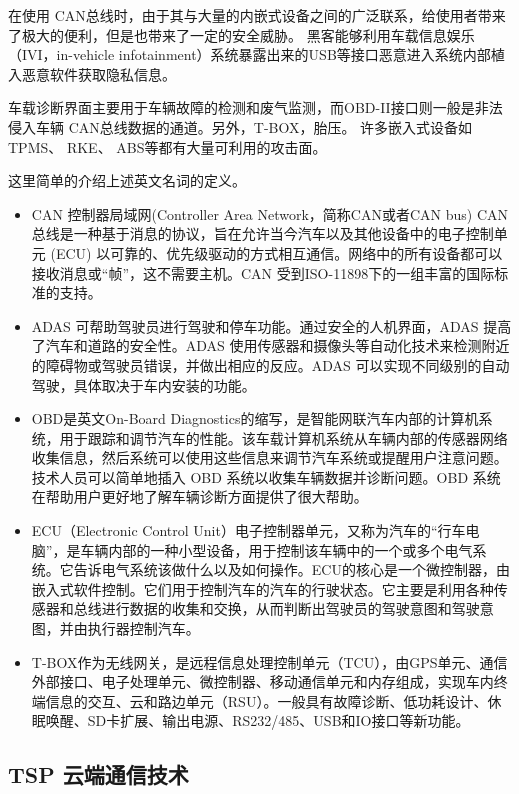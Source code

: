 在使用 CAN总线时，由于其与大量的内嵌式设备之间的广泛联系，给使用者带来了极大的便利，但是也带来了一定的安全威胁。
黑客能够利用车载信息娱乐（IVI，in-vehicle infotainment）系统暴露出来的USB等接口恶意进入系统内部植入恶意软件获取隐私信息。

车载诊断界面主要用于车辆故障的检测和废气监测，而OBD-II接口则一般是非法侵入车辆 CAN总线数据的通道。另外，T-BOX，胎压。
许多嵌入式设备如 TPMS、 RKE、 ABS等都有大量可利用的攻击面。

这里简单的介绍上述英文名词的定义。
\begin{itemize}
    \item CAN 控制器局域网(Controller Area Network，简称CAN或者CAN bus) CAN 总线是一种基于消息的协议，旨在允许当今汽车以及其他设备中的电子控制单元 (ECU) 以可靠的、优先级驱动的方式相互通信。网络中的所有设备都可以接收消息或“帧”，这不需要主机。CAN 受到ISO-11898下的一组丰富的国际标准的支持。
    \item ADAS 可帮助驾驶员进行驾驶和停车功能。通过安全的人机界面，ADAS 提高了汽车和道路的安全性。ADAS 使用传感器和摄像头等自动化技术来检测附近的障碍物或驾驶员错误，并做出相应的反应。ADAS 可以实现不同级别的自动驾驶，具体取决于车内安装的功能。
    \item OBD是英文On-Board Diagnostics的缩写，是智能网联汽车内部的计算机系统，用于跟踪和调节汽车的性能。该车载计算机系统从车辆内部的传感器网络收集信息，然后系统可以使用这些信息来调节汽车系统或提醒用户注意问题。技术人员可以简单地插入 OBD 系统以收集车辆数据并诊断问题。OBD 系统在帮助用户更好地了解车辆诊断方面提供了很大帮助。
    \item ECU（Electronic Control Unit）电子控制器单元，又称为汽车的“行车电脑”，是车辆内部的一种小型设备，用于控制该车辆中的一个或多个电气系统。它告诉电气系统该做什么以及如何操作。ECU的核心是一个微控制器，由嵌入式软件控制。它们用于控制汽车的汽车的行驶状态。它主要是利用各种传感器和总线进行数据的收集和交换，从而判断出驾驶员的驾驶意图和驾驶意图，并由执行器控制汽车。
    \item T-BOX作为无线网关，是远程信息处理控制单元（TCU），由GPS单元、通信外部接口、电子处理单元、微控制器、移动通信单元和内存组成，实现车内终端信息的交互、云和路边单元（RSU）。一般具有故障诊断、低功耗设计、休眠唤醒、SD卡扩展、输出电源、RS232/485、USB和IO接口等新功能。
\end{itemize}
\subsection{TSP 云端通信技术}

